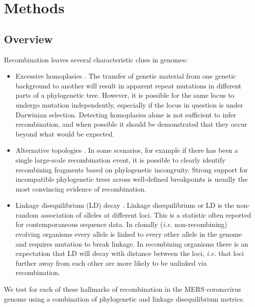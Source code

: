 \documentclass[11pt,oneside,letterpaper]{article}
\begin{document}
\section*{Methods}
\subsection*{Overview}
Recombination leaves several characteristic clues in genomes:
\begin{itemize}
\item{Excessive homoplasies \citep{smith_1998}.
The transfer of genetic material from one genetic background to another will result in apparent repeat mutations in different parts of a phylogenetic tree.
However, it is possible for the same locus to undergo mutation independently, especially if the locus in question is under Darwinian selection.
Detecting homoplasies alone is not sufficient to infer recombination, and when possible it should be demonstrated that they occur beyond what would be expected.}
\item{Alternative topologies \citep{robertson_aids_1995,robertson_hiv_1995,holmes_1999}. 
In some scenarios, for example if there has been a single large-scale recombination event, it is possible to clearly identify recombining fragments based on phylogenetic incongruity.
Strong support for incompatible phylogenetic trees across well-defined breakpoints is usually the most convincing evidence of recombination.}
\item{Linkage disequilibrium (LD) decay \citep{meunier_2001}.
Linkage disequilibrium or LD is the non-random association of alleles at different loci.
This is a statistic often reported for contemporaneous sequence data.
In clonally (\textit{i.e.} non-recombining) evolving organisms every allele is linked to every other allele in the genome and requires mutation to break linkage.
In recombining organisms there is an expectation that LD will decay with distance between the loci, \textit{i.e.} that loci further away from each other are more likely to be unlinked via recombination.}
\end{itemize}
We test for each of these hallmarks of recombination in the MERS coronavirus genome using a combination of phylogenetic and linkage disequilibrium metrics.
\end{document}
